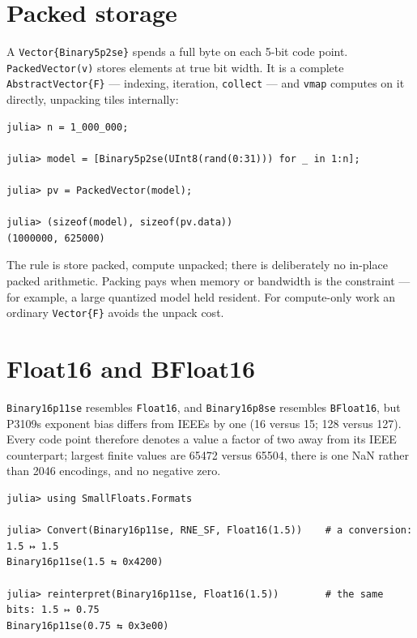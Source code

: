 \section{Packed storage}



\label{8567984038512272605}{}


A \texttt{Vector\{Binary5p2se\}} spends a full byte on each 5-bit code point. \texttt{PackedVector(v)} stores elements at true bit width. It is a complete \texttt{AbstractVector\{F\}} — indexing, iteration, \texttt{collect} — and \texttt{vmap} computes on it directly, unpacking tiles internally:




\nopagebreak[4]
\begin{verbatim}
julia> n = 1_000_000;

julia> model = [Binary5p2se(UInt8(rand(0:31))) for _ in 1:n];

julia> pv = PackedVector(model);

julia> (sizeof(model), sizeof(pv.data))
(1000000, 625000)
\end{verbatim}



The rule is store packed, compute unpacked; there is deliberately no in-place packed arithmetic. Packing pays when memory or bandwidth is the constraint — for example, a large quantized model held resident. For compute-only work an ordinary \texttt{Vector\{F\}} avoids the unpack cost.



\section{Float16 and BFloat16}



\label{10938659776745642755}{}


\texttt{Binary16p11se} resembles \texttt{Float16}, and \texttt{Binary16p8se} resembles \texttt{BFloat16}, but P3109{\textquotesingle}s exponent bias differs from IEEE{\textquotesingle}s by one (16 versus 15; 128 versus 127). Every code point therefore denotes a value a factor of two away from its IEEE counterpart; largest finite values are 65472 versus 65504, there is one NaN rather than 2046 encodings, and no negative zero.




\begin{verbatim}
julia> using SmallFloats.Formats

julia> Convert(Binary16p11se, RNE_SF, Float16(1.5))    # a conversion: 1.5 ↦ 1.5
Binary16p11se(1.5 ⇆ 0x4200)

julia> reinterpret(Binary16p11se, Float16(1.5))        # the same bits: 1.5 ↦ 0.75
Binary16p11se(0.75 ⇆ 0x3e00)
\end{verbatim}



